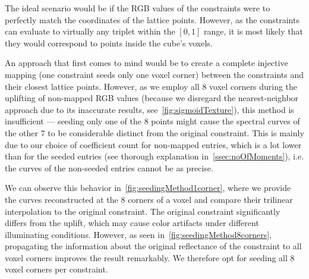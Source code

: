 The ideal scenario would be if the RGB values of the constraints were to perfectly match the coordinates of the lattice points. However, as the constraints can evaluate to virtually any triplet within the $[0,1]$ range, it is most likely that they would correspond to points inside the cube's voxels.

An approach that first comes to mind would be to create a complete injective mapping (one constraint seeds only one voxel corner) between the constraints and their closest lattice points. However, as we employ all 8 voxel corners during the uplifting of non-mapped RGB values (because we disregard the nearest-neighbor approach due to its inaccurate results, see~\cref{fig:sigmoidTexture}), this method is insufficient --- seeding only one of the 8 points might cause the spectral curves of the other 7 to be considerable distinct from the original constraint. This is mainly due to our choice of coefficient count for non-mapped entries, which is a lot lower than for the seeded entries (see thorough explanation in~\cref{ssec:noOfMoments}), i.e. the curves of the non-seeded entries cannot be as precise. 

We can observe this behavior in~\cref{fig:seedingMethod1corner}, where we provide the curves reconstructed at the 8 corners of a voxel and compare their trilinear interpolation to the original constraint. The original constraint significantly differs from the uplift, which may cause color artifacts under different illuminating conditions. However, as seen in~\cref{fig:seedingMethod8corners}, propagating the information about the original reflectance of the constraint to all voxel corners improves the result remarkably. We therefore opt for seeding all 8 voxel corners per constraint.

